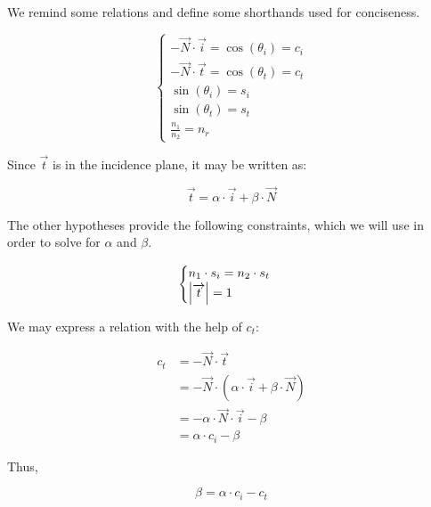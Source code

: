 We remind some relations and define some shorthands used for conciseness.

\begin{equation} \begin{cases}
- \overrightarrow{N} \cdot \overrightarrow{i} = \cos(\theta_i) = c_i \\
- \overrightarrow{N} \cdot \overrightarrow{t} = \cos(\theta_t) = c_t \\
\sin(\theta_i) = s_i \\
\sin(\theta_t) = s_t \\
\frac{n_1}{n_2} = n_r
\end{cases} \end{equation}

Since $\overrightarrow{t}$ is in the incidence plane, it may be written as:

\begin{equation}
\overrightarrow{t} = \alpha \cdot \overrightarrow{i}
                     + \beta \cdot \overrightarrow{N}
\end{equation}

The other hypotheses provide the following constraints, which we will use
in order to solve for $\alpha$ and $\beta$.

\begin{equation} \begin{cases}
n_1 \cdot s_i = n_2 \cdot s_t \\
\abs{\overrightarrow{t}} = 1
\end{cases} \end{equation}

We may express a relation with the help of $c_t$:

\begin{equation} \begin{split}
c_t &= - \overrightarrow{N} \cdot \overrightarrow{t} \\
&= - \overrightarrow{N} \cdot
   (\alpha \cdot \overrightarrow{i} + \beta \cdot \overrightarrow{N}) \\
&= - \alpha \cdot \overrightarrow{N} \cdot \overrightarrow{i} - \beta \\
&= \alpha \cdot c_i - \beta
\end{split} \end{equation}

Thus,

\begin{equation}
\beta = \alpha \cdot c_i - c_t
\end{equation}

